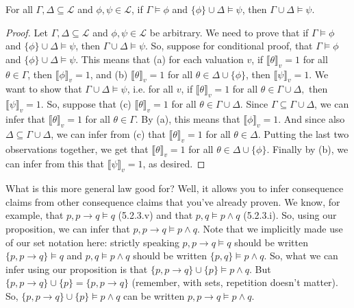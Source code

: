 \begin{enumerate}[\thesection.1]
		\begin{proposition}
		For all $\Gamma,\Delta\subseteq\mathcal{L}$ and $\phi,\psi\in\mathcal{L}$, if $\Gamma\vDash\phi$ and $\{\phi\}\cup\Delta\vDash\psi$, then $\Gamma\cup\Delta\vDash\psi$.
		\end{proposition}
		\begin{proof}
		Let $\Gamma,\Delta\subseteq\mathcal{L}$ and $\phi,\psi\in\mathcal{L}$ be arbitrary. We need to prove that  if $\Gamma\vDash\phi$ and $\{\phi\}\cup\Delta\vDash\psi$, then $\Gamma\cup\Delta\vDash\psi$. So, suppose for conditional proof, that $\Gamma\vDash\phi$ and $\{\phi\}\cup\Delta\vDash\psi$. This means that (a) for each valuation $v$, if $\llbracket\theta\rrbracket_v=1$ for all $\theta\in\Gamma$, then $\llbracket \phi\rrbracket_v=1$, and (b) $\llbracket\theta\rrbracket_v=1$ for all $\theta\in\Delta\cup\{\phi\}$, then $\llbracket \psi\rrbracket_v=1$. We want to show that $\Gamma\cup\Delta\vDash\psi$, i.e. for all $v$, if $\llbracket \theta\rrbracket_v=1$ for all $\theta\in\Gamma\cup\Delta,$ then $\llbracket\psi\rrbracket_v=1$. So, suppose that (c) $\llbracket \theta\rrbracket_v=1$ for all $\theta\in\Gamma\cup\Delta$. Since $\Gamma\subseteq \Gamma\cup \Delta$, we can infer that $\llbracket \theta\rrbracket_v=1$ for all $\theta\in\Gamma$. By (a), this means that $\llbracket \phi\rrbracket_v=1$. And since also $\Delta\subseteq \Gamma\cup \Delta$, we can infer from (c) that $\llbracket \theta\rrbracket_v=1$ for all $\theta\in\Delta$. Putting the last two observations together, we get that $\llbracket\theta\rrbracket_v=1$ for all $\theta\in\Delta\cup\{\phi\}$. Finally by (b), we can infer from this that $\llbracket\psi\rrbracket_v=1$, as desired.
		\end{proof}
What is this more general law good for? Well, it allows you to infer consequence claims from other consequence claims that you've already proven. We know, for example, that $p, p\to q\vDash q$ (5.2.3.v) and that $p,q\vDash p\land q$ (5.2.3.i). So, using our proposition, we can infer that $p,p\to q\vDash p\land q$. Note that we implicitly made use of our set notation here: strictly speaking  $p, p\to q\vDash q$ should be written  $\{p, p\to q\}\vDash q$ and $p,q\vDash p\land q$ should be written $\{p,q\}\vDash p\land q$. So, what we can infer using our proposition is that $\{p, p\to q\}\cup \{p\}\vDash p\land q$. But $\{p, p\to q\}\cup \{p\}=\{p,p\to q\}$ (remember, with sets, repetition doesn't matter). So, $\{p, p\to q\}\cup \{p\}\vDash p\land q$ can be written $p,p\to q\vDash p\land q$.


\end{enumerate}
